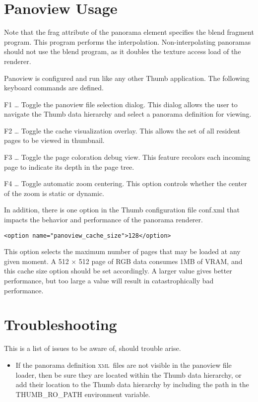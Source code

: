 \documentclass[article,twocolumn,10pt]{memoir}
\newcommand{\xml}     {\textsc{xml}}
\begin{document}
\begin{Spacing}{1.1}
\section{Panoview Usage}

Note that the frag attribute of the panorama element specifies the blend fragment program. This program performs the interpolation. Non-interpolating panoramas should not use the blend program, as it doubles the texture access load of the renderer.

Panoview is configured and run like any other Thumb application. The following keyboard commands are defined.

F1 … Toggle the panoview file selection dialog. This dialog allows the user to navigate the Thumb data hierarchy and select a panorama definition for viewing.

F2 … Toggle the cache visualization overlay. This allows the set of all resident pages to be viewed in thumbnail.

F3 … Toggle the page coloration debug view. This feature recolors each incoming page to indicate its depth in the page tree.

F4 … Toggle automatic zoom centering. This option controls whether the center of the zoom is static or dynamic.

In addition, there is one option in the Thumb configuration file conf.xml that impacts the behavior and performance of the panorama renderer.

\begin{verbatim}
<option name="panoview_cache_size">128</option>
\end{verbatim}

This option selects the maximum number of pages that may be loaded at any given moment. A 512 × 512 page of RGB data consumes 1MB of VRAM, and this cache size option should be set accordingly. A larger value gives better performance, but too large a value will result in catastrophically bad performance.



\section{Troubleshooting}

This is a list of issues to be aware of, should trouble arise.

\begin{itemize}
\item If the panorama definition \xml\ files are not visible in the panoview file loader, then be sure they are located within the Thumb data hierarchy, or add their location to the Thumb data hierarchy by including the path in the THUMB\_RO\_PATH environment variable.


\end{itemize}
\end{Spacing}
\end{document}
